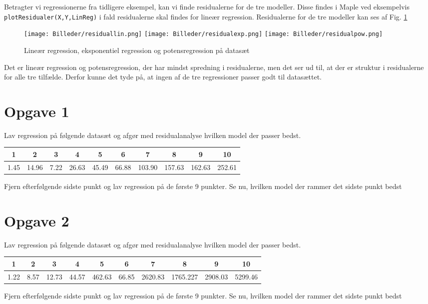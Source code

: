 \begin{exa}
Betragter vi regressionerne fra tidligere eksempel, kan vi finde residualerne for de tre modeller. Disse findes i Maple ved eksempelvis \texttt{plotResidualer(X,Y,LinReg)} i fald residualerne skal findes for lineær regression. Residualerne for de tre modeller kan ses af Fig. \ref{fig:resplot}
\begin{figure}[H]
\centering
\texttt{[image: Billeder/residuallin.png]}
\texttt{[image: Billeder/residualexp.png]}
\texttt{[image: Billeder/residualpow.png]}
\caption{Lineær regression, eksponentiel regression og potensregression på datasæt}
\label{fig:resplot}
\end{figure}
Det er lineær regression og potensregression, der har mindst spredning i residualerne, men det ser ud til, at der er struktur i residualerne for alle tre tilfælde. Derfor kunne det tyde på, at ingen af de tre regressioner passer godt til datasættet.
\end{exa}
\section*{Opgave 1}

Lav regression på følgende datasæt og afgør med residualanalyse hvilken model der passer bedst.
\begin{center}
\begin{tabular}{c|c|c|c|c|c|c|c|c|c}
1 & 2 & 3 & 4 & 5 & 6 & 7 & 8 & 9 & 10\\ \hline
1.45 & 14.96 & 7.22 & 26.63 & 45.49 & 66.88 & 103.90&157.63 & 162.63 & 252.61
\end{tabular}
\end{center}
Fjern efterfølgende sidste punkt og lav regression på de første 9 punkter. Se nu, hvilken model der rammer det sidste punkt bedst


\section*{Opgave 2}
Lav regression på følgende datasæt og afgør med residualanalyse hvilken model der passer bedst.
\begin{center}
\begin{tabular}{c|c|c|c|c|c|c|c|c|c}
1 & 2 & 3 & 4 & 5 & 6 & 7 & 8 & 9 & 10\\ \hline
1.22& 8.57 &12.73& 44.57&
 462.63& 66.85& 2620.83 &1765.227
& 2908.03& 5299.46
\end{tabular}
\end{center}
Fjern efterfølgende sidste punkt og lav regression på de første 9 punkter. Se nu, hvilken model der rammer det sidste punkt bedst



